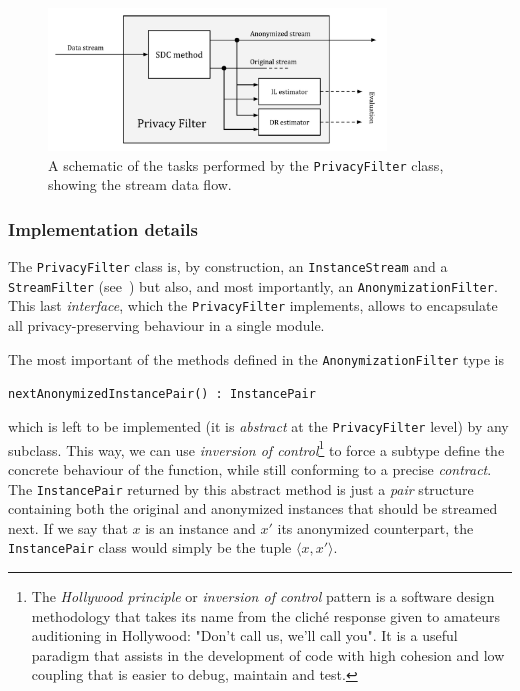 \begin{figure}[h]
	\centering
	\includegraphics[width=0.8\textwidth]{figures/privacy-filter-schematic.pdf}
	\caption{A schematic of the tasks performed by the \texttt{PrivacyFilter} class, showing the stream data flow.}
	\label{fig:privacy-filter-schematic}
\end{figure}

\subsubsection*{Implementation details}
\label{Implementation:PrivacyFilter:PrivacyFilter:Details}

The \texttt{PrivacyFilter} class is, by construction, an \texttt{InstanceStream} and a \texttt{StreamFilter} (see~) but also, and most importantly, an \texttt{AnonymizationFilter}. This last \textit{interface}, which the \texttt{PrivacyFilter} implements, allows to encapsulate all privacy-preserving behaviour in a single module.

The most important of the methods defined in the \texttt{AnonymizationFilter} type is

\begin{center}
	\texttt{nextAnonymizedInstancePair() : InstancePair}
\end{center}

which is left to be implemented (it is \textit{abstract} at the \texttt{PrivacyFilter} level) by any subclass. This way, we can use \textit{inversion of control}\footnote{The \textit{Hollywood principle} or \textit{inversion of control} pattern is a software design methodology that takes its name from the cliché response given to amateurs auditioning in Hollywood: "Don't call us, we'll call you". It is a useful paradigm that assists in the development of code with high cohesion and low coupling that is easier to debug, maintain and test.} to force a subtype define the concrete behaviour of the function, while still conforming to a precise \textit{contract}. The \texttt{InstancePair} returned by this abstract method is just a \textit{pair} structure containing both the original and anonymized instances that should be streamed next. If we say that $x$ is an instance and $x'$ its anonymized counterpart, the \texttt{InstancePair} class would simply be the tuple $\langle x, x' \rangle$.

